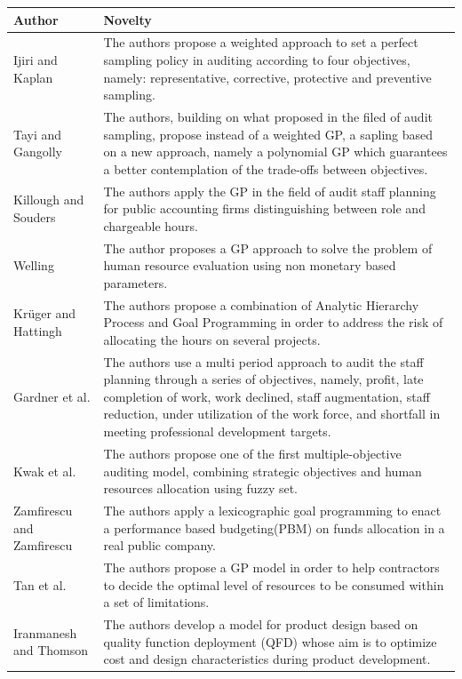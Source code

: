 \begin{doublespace}
\begin{center}
\begin{longtable}{ || m{11em} m{20em}|| }
 \hline
 Author & Novelty \\ 
\hline\hline
Ijiri and Kaplan\cite{Ijiri1971} & The authors propose a weighted approach to set a perfect sampling policy in auditing according to four objectives, namely: representative, corrective, protective and preventive sampling. \\
\hline
Tayi and Gangolly\cite{Tayi1985} & The authors, building on what proposed in the filed of audit sampling, propose instead of a weighted GP, a sapling based on a new approach, namely a polynomial GP which guarantees a better contemplation of the trade-offs between objectives. \\
\hline
Killough and Souders\cite{Killough1973} & The authors apply the GP in the field of audit staff planning for public accounting firms distinguishing between role and chargeable hours. \\
\hline
Welling\cite{Welling1977} & The author proposes a GP approach to solve the problem of human resource evaluation using non monetary based parameters. \\
\hline
Krüger and Hattingh\cite{Kruger2006} & The authors propose a combination of Analytic Hierarchy Process and Goal Programming in order to address the risk of allocating the hours on several projects. \\
\hline
Gardner et al.\cite{Gardner1990} & The authors use a multi period approach to audit the staff planning through a series of objectives, namely, profit, late completion of work, work declined, staff augmentation, staff reduction, under utilization of the work force, and shortfall in meeting professional development targets. \\
\hline
Kwak et al.\cite{Kwak2003} & The authors propose one of the first multiple-objective auditing model, combining strategic objectives and human resources allocation using fuzzy set. \\
\hline
Zamfirescu and Zamfirescu\cite{Zamfirescu2013} & The authors apply a lexicographic goal programming to enact a performance based budgeting(PBM) on funds allocation in a real public company. \\
\w
Tan et al.\cite{Tan2008} & The authors propose a GP model in order to help contractors to decide the optimal level of resources to be consumed within a set of limitations.  \\
\hline 
Iranmanesh and Thomson\cite{Iranmanesh2008} & The authors develop a model for product design based
on quality function deployment (QFD) whose aim is to optimize cost and design characteristics during product
development. \\
 \hline\end{longtable}
\end{center}


\end{doublespace}
